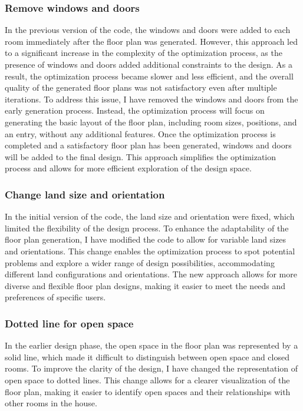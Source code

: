 \documentclass[]{article}
\begin{document}
\subsubsection{Remove windows and doors}
In the previous version of the code, the windows and doors were added to each room immediately after the floor plan was generated. However, this approach led to a significant increase in the complexity of the optimization process, as the presence of windows and doors added additional constraints to the design. As a result, the optimization process became slower and less efficient, and the overall quality of the generated floor plans was not satisfactory even after multiple iterations.
To address this issue, I have removed the windows and doors from the early generation process. Instead, the optimization process will focus on generating the basic layout of the floor plan, including room sizes, positions, and an entry, without any additional features. Once the optimization process is completed and a satisfactory floor plan has been generated, windows and doors will be added to the final design. This approach simplifies the optimization process and allows for more efficient exploration of the design space.

\subsubsection{Change land size and orientation}
In the initial version of the code, the land size and orientation were fixed, which limited the flexibility of the design process. To enhance the adaptability of the floor plan generation, I have modified the code to allow for variable land sizes and orientations. This change enables the optimization process to spot potential problems and explore a wider range of design possibilities, accommodating different land configurations and orientations. The new approach allows for more diverse and flexible floor plan designs, making it easier to meet the needs and preferences of specific users.

\subsubsection{Dotted line for open space}
In the earlier design phase, the open space in the floor plan was represented by a solid line, which made it difficult to distinguish between open space and closed rooms. To improve the clarity of the design, I have changed the representation of open space to dotted lines. This change allows for a clearer visualization of the floor plan, making it easier to identify open spaces and their relationships with other rooms in the house.
\end{document}
